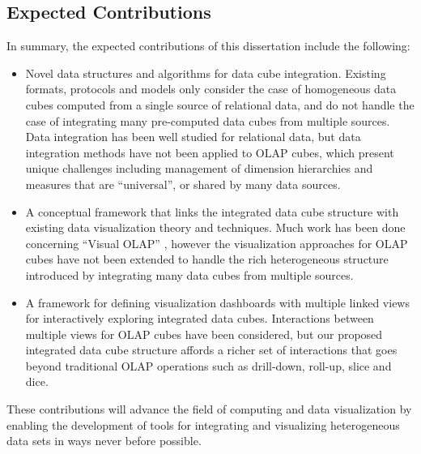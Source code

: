 \documentclass[12pt]{article}
\begin{document}
\begin{doublespace}
\section{Expected Contributions}
In summary, the expected contributions of this dissertation include the following:
\begin{itemize}
\item Novel data structures and algorithms for data cube integration. Existing formats, protocols and models only consider the case of homogeneous data cubes computed from a single source of relational data, and do not handle the case of integrating many pre-computed data cubes from multiple sources. Data integration has been well studied for relational data, but data integration methods have not been applied to OLAP cubes, which present unique challenges including management of dimension hierarchies and measures that are ``universal'', or shared by many data sources.
\item A conceptual framework that links the integrated data cube structure with existing data visualization theory and techniques. Much work has been done concerning ``Visual OLAP'' \cite{mansmann2008visual}, however the visualization approaches for OLAP cubes have not been extended to handle the rich heterogeneous structure introduced by integrating many data cubes from multiple sources.
\item A framework for defining visualization dashboards with multiple linked views for interactively exploring integrated data cubes. Interactions between multiple views for OLAP cubes have been considered, but our proposed integrated data cube structure affords a richer set of interactions that goes beyond traditional OLAP operations such as drill-down, roll-up, slice and dice.
\end{itemize}

These contributions will advance the field of computing and data visualization by enabling the development of tools for integrating and visualizing heterogeneous data sets in ways never before possible.
\end{doublespace}


\end{document}
